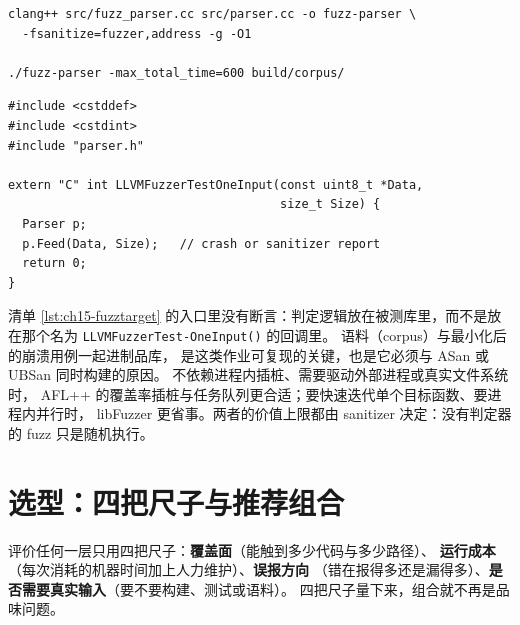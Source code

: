 \documentclass[12pt,a4paper,fontset=fandol]{ctexbook}
\begin{document}
\begin{lstlisting}[style=shellstyle,caption={fuzz 驱动与 ASan 一起链接},label={lst:ch15-fuzz}]
clang++ src/fuzz_parser.cc src/parser.cc -o fuzz-parser \
  -fsanitize=fuzzer,address -g -O1

./fuzz-parser -max_total_time=600 build/corpus/
\end{lstlisting}

\begin{lstlisting}[style=cppstyle,caption={最小 fuzz 目标：入口只提供字节},label={lst:ch15-fuzztarget}]
#include <cstddef>
#include <cstdint>
#include "parser.h"

extern "C" int LLVMFuzzerTestOneInput(const uint8_t *Data,
                                      size_t Size) {
  Parser p;
  p.Feed(Data, Size);   // crash or sanitizer report
  return 0;
}
\end{lstlisting}

清单 \ref{lst:ch15-fuzztarget} 的入口里没有断言：判定逻辑放在被测库里，而不是放在那个名为
\texttt{LLVMFuzzerTest-\allowbreak OneInput()} 的回调里。
语料（corpus）与最小化后的崩溃用例一起进制品库，
是这类作业可复现的关键，也是它必须与 ASan 或 UBSan 同时构建的原因。
不依赖进程内插桩、需要驱动外部进程或真实文件系统时，
AFL++ 的覆盖率插桩与任务队列更合适；要快速迭代单个目标函数、要进程内并行时，
libFuzzer 更省事。两者的价值上限都由 sanitizer 决定：没有判定器的 fuzz 只是随机执行。

\section{选型：四把尺子与推荐组合}\label{sec:ch15-s6}

评价任何一层只用四把尺子：\textbf{覆盖面}（能触到多少代码与多少路径）、
\textbf{运行成本}（每次消耗的机器时间加上人力维护）、\textbf{误报方向}
（错在报得多还是漏得多）、\textbf{是否需要真实输入}（要不要构建、测试或语料）。
四把尺子量下来，组合就不再是品味问题。
\end{document}
